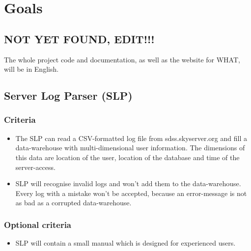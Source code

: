 \section{Goals}

\subsection{NOT YET FOUND, EDIT!!!}

The whole project code and documentation, as well as the website for WHAT, will be in English. 

\subsection{Server Log Parser (SLP)}


\subsubsection{Criteria} %
\begin{itemize}
\item The SLP can read a CSV-formatted log file from sdss.skyserver.org
 and fill a data-warehouse with multi-dimensional user information.
 The dimensions of this data are location of the user, location of the 
 database and time of the server-access. 
\item SLP will recognise invalid logs and won't add them to the data-warehouse.
 Every log with a mistake won't be accepted, because an error-message is not 
 as bad as a corrupted data-warehouse. 
\end{itemize}

\subsubsection{Optional criteria}
\begin{itemize}
\item SLP will contain a small manual which is designed for experienced users.
\end{itemize}

